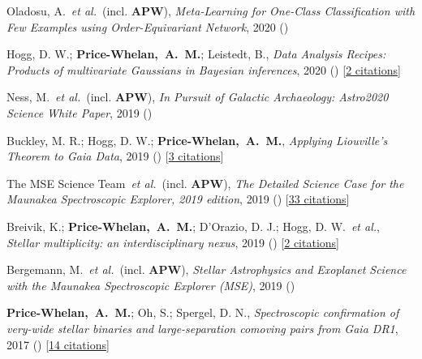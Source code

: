 \item[{\color{deemph}\scriptsize8}]Oladosu, A.~\textit{et al.}~(incl. \textbf{APW}), \textit{Meta-Learning for One-Class Classification with Few Examples using Order-Equivariant Network}, 2020 ()

\item[{\color{deemph}\scriptsize7}]Hogg, D. W.; \textbf{Price-Whelan,~A.~M.}; Leistedt, B., \textit{Data Analysis Recipes: Products of multivariate Gaussians in Bayesian inferences}, 2020 () [\href{http://adsabs.harvard.edu/abs/2020arXiv200514199H}{2 citations}]

\item[{\color{deemph}\scriptsize6}]Ness, M.~\textit{et al.}~(incl. \textbf{APW}), \textit{In Pursuit of Galactic Archaeology: Astro2020 Science White Paper}, 2019 ()

\item[{\color{deemph}\scriptsize5}]Buckley, M. R.; Hogg, D. W.; \textbf{Price-Whelan,~A.~M.}, \textit{Applying Liouville's Theorem to Gaia Data}, 2019 () [\href{http://adsabs.harvard.edu/abs/2019arXiv190700987B}{3 citations}]

\item[{\color{deemph}\scriptsize4}]The MSE Science Team~\textit{et al.}~(incl. \textbf{APW}), \textit{The Detailed Science Case for the Maunakea Spectroscopic Explorer, 2019 edition}, 2019 () [\href{http://adsabs.harvard.edu/abs/2019arXiv190404907T}{33 citations}]

\item[{\color{deemph}\scriptsize3}]Breivik, K.; \textbf{Price-Whelan,~A.~M.}; D'Orazio, D. J.; Hogg, D. W.~\textit{et al.}, \textit{Stellar multiplicity: an interdisciplinary nexus}, 2019 () [\href{http://adsabs.harvard.edu/abs/2019arXiv190305094B}{2 citations}]

\item[{\color{deemph}\scriptsize2}]Bergemann, M.~\textit{et al.}~(incl. \textbf{APW}), \textit{Stellar Astrophysics and Exoplanet Science with the Maunakea Spectroscopic Explorer (MSE)}, 2019 ()

\item[{\color{deemph}\scriptsize1}]\textbf{Price-Whelan,~A.~M.}; Oh, S.; Spergel, D. N., \textit{Spectroscopic confirmation of very-wide stellar binaries and large-separation comoving pairs from Gaia DR1}, 2017 () [\href{http://adsabs.harvard.edu/abs/2017arXiv170903532P}{14 citations}]